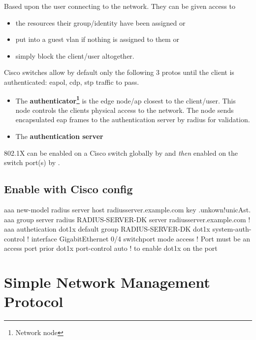 
Based upon the user connecting to the network. They can be given access to
\begin{itemize}
	\item the resources their group/identity have been assigned or
	\item put into a guest \gls{vlan} if nothing is assigned to them or
	\item simply block the client/user altogether.
\end{itemize}

Cisco switches allow by default only the following 3 protos until the client is authenticated: \gls{eapol}, \gls{cdp}, \gls{stp} traffic to pass.

\begin{itemize}
	\item The \textbf{authenticator\footnote{Network node}} is the edge node/\gls{ap} closest to the client/user. This node controls the clients physical access to the network. The node sends encapsulated \gls{eap} frames to the authentication server by radius for validation.
	\item The \textbf{authentication server}
\end{itemize}


802.1X can be enabled on a Cisco switch globally by  and \textit{then} enabled on the switch port{\footnotesize (s)} by .

\subsection*{Enable with Cisco config}

\begin{cisco}
aaa new-model
radius server host radiusserver.example.com key .unkown!unicAst.
 aaa group server radius RADIUS-SERVER-DK
 server radiusserver.example.com
!
aaa authetication dot1x default group RADIUS-SERVER-DK
 dot1x system-auth-control
!
interface GigabitEthernet 0/4
 switchport mode access         ! Port must be an access port prior
 dot1x port-control auto        ! to enable dot1x on the port
\end{cisco}

\section[SNMP]{Simple Network Management Protocol}

